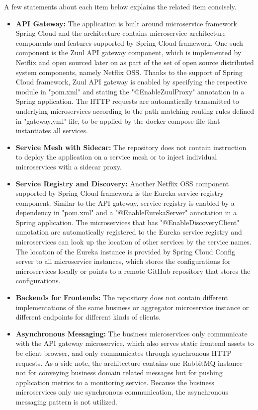 \documentclass{Configuration_Files/PoliMi3i_thesis}
\begin{document}
A few statements about each item below explains the related item concisely.

\begin{itemize}
    \item \textbf{API Gateway:} The application is built around microservice framework Spring Cloud and the architecture contains microservice architecture components and features supported by Spring Cloud framework. 
    One such component is the Zuul API gateway component, which is implemented by Netflix and open sourced later on as part of the set of open source distributed system components, namely  Netflix OSS.
    Thanks to the support of Spring Cloud framework, Zuul API gateway is enabled by specifying the respective module in "pom.xml" and stating the "@EnableZuulProxy" annotation in a Spring application.
    The HTTP requests are automatically transmitted to underlying microservices according to the path matching routing rules defined in "gateway.yml" file, to be applied by the docker-compose file that instantiates all services.
    
    \item \textbf{Service Mesh with Sidecar:} The repository does not contain instruction to deploy the application on a service mesh or to inject individual microservices with a sidecar proxy.
    
    \item \textbf{Service Registry and Discovery:} Another Netflix OSS component supported by Spring Cloud framework is the Eureka service registry component.
    Similar to the API gateway, service registry is enabled by a dependency in "pom.xml" and a "@EnableEurekaServer" annotation in a Spring application.
    The microservices that has "@EnableDiscoveryClient" annotation are automatically registered to the Eureka service registry and microservices can look up the location of other services by the service names.
    The location of the Eureka instance is provided by Spring Cloud Config server to all microservice instances, which stores the configurations for microservices locally or points to a remote GitHub repository that stores the configurations.
    
    \item \textbf{Backends for Frontends:} The repository does not contain different implementations of the same business or aggregator microservice instance or different endpoints for different kinds of clients.
    
    \item \textbf{Asynchronous Messaging:} The business microservices only communicate with the API gateway microservice, which also serves static frontend assets to be client browser, and only communicates through synchronous HTTP requests.
    As a side note, the architecture contains one RabbitMQ instance not for conveying business domain related messages but for pushing application metrics to a monitoring service.
    Because the business microservices only use synchronous communication, the asynchronous messaging pattern is not utilized.
    

\end{itemize}
\end{document}
